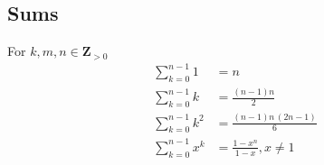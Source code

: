 \documentclass[letterpaper,9pt,fleqn]{extarticle}
\begin{document}
\begin{multicols*}{3}
\begin{minipage}{0.33333333333333\textwidth}
\section*{Sums}
\vspace{-0.35in}
For \(k, m,n\in \mathbf{Z}_{>0}\) 
\begin{align*}
    \sum_{k=0}^{n-1}1 &= n \\
     \sum_{k=0}^{n-1}{\left. k\right.} &=\frac{\left( n-1\right)  n}{2}\\
    \sum_{k=0}^{n-1}{\left. {{k}^{2}}\right.} &=\frac{\left( n-1\right)  n\, \left( 2 n-1\right) }{6}\\
    \sum_{k=0}^{n-1} x^k &= \frac{1-x^n}{1-x},  x \neq 1
 \end{align*}
\begin{comment}
(c) Inverse trig
\begin{align*}
\int {\left. \operatorname{acos}(x)\mathrm{d} x\right.}&=x \operatorname{acos}(x)-\sqrt{1-{{x}^{2}}},\\
\int {\left. \operatorname{asin}(x)\mathrm{d} x\right.}&=x \operatorname{asin}(x)+\sqrt{1-{{x}^{2}}},\\
\int {\left. \operatorname{atan}(x)\mathrm{d} x\right.}&=x \operatorname{atan}(x)-\nicefrac{\log{\left( {{x}^{2}}+1\right) }}{2}.
\end{align*}
(b)  Hyperbolic
\begin{align}
\int {\left. \cosh{(x)}\mathrm{d} x\right.}&=\operatorname{sinh}(x),\\
\int {\left. \operatorname{sinh}(x)\mathrm{d} x\right.}&=\cosh{(x)},\\
\int {\left. \operatorname{tanh}(x)\mathrm{d} x\right.}&=\ln{\left( \cosh{(x)}\right) },\\
\int {\left. \operatorname{sech}(x)\mathrm{d} x\right.}&=\operatorname{atan}\left( \operatorname{sinh}(x)\right) ,\\
\int {\left. \operatorname{csch}(x)\mathrm{d} x\right.}&=\ln{\left( \operatorname{tanh}\left( \nicefrac{x}{2}\right) \right) },\\
\int {\left. \operatorname{coth}(x)\mathrm{d} x\right.}&=\ln{\left( \operatorname{sinh}(x)\right) }.

\end{comment}
\end{minipage}
\end{multicols*}
\end{document}
